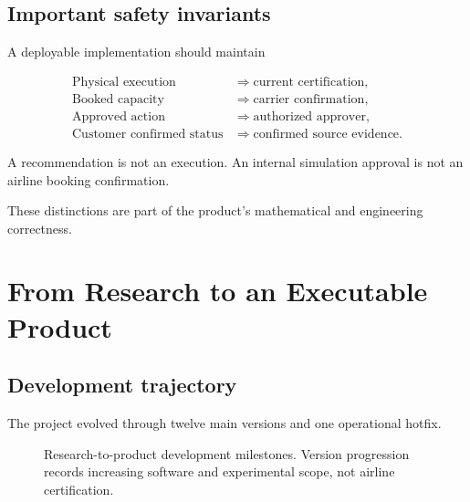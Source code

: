 \documentclass[10pt,a4paper]{article}
\theoremstyle{plain}
\theoremstyle{definition}
\theoremstyle{remark}
\begin{document}
\subsection{Important safety invariants}

A deployable implementation should maintain

\begin{align}
\text{Physical execution}
&\Longrightarrow
\text{current certification},
\\
\text{Booked capacity}
&\Longrightarrow
\text{carrier confirmation},
\\
\text{Approved action}
&\Longrightarrow
\text{authorized approver},
\\
\text{Customer confirmed status}
&\Longrightarrow
\text{confirmed source evidence}.
\end{align}

A recommendation is not an execution.
An internal simulation approval is not
an airline booking confirmation.

These distinctions are part of
the product's mathematical
and engineering correctness.

\section{From Research to an Executable Product}

\subsection{Development trajectory}

The project evolved through twelve main versions
and one operational hotfix.

\begin{figure}[!htbp]
\centering


\caption{
Research-to-product development milestones.
Version progression records increasing
software and experimental scope,
not airline certification.
}
\label{fig:journey}
\end{figure}
\end{document}
